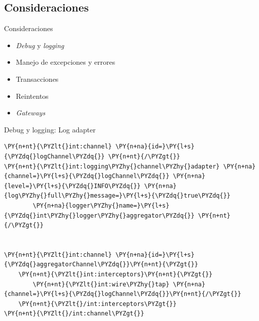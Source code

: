 \documentclass{beamer}
\begin{document}
\subsection{Consideraciones}
\begin{frame}{Consideraciones}
\begin{itemize}
\item \textit{Debug} y \textit{logging}
\item Manejo de excepciones y errores
\item Transacciones
\item Reintentos
\item \textit{Gateways}
\end{itemize}
\end{frame}

\begin{frame}[fragile]{Debug y logging: Log adapter}
\begin{Verbatim}[fontsize=\tiny,commandchars=\\\{\}]
\PY{n+nt}{\PYZlt{}int:channel} \PY{n+na}{id=}\PY{l+s}{\PYZdq{}logChannel\PYZdq{}} \PY{n+nt}{/\PYZgt{}}
\PY{n+nt}{\PYZlt{}int:logging\PYZhy{}channel\PYZhy{}adapter} \PY{n+na}{channel=}\PY{l+s}{\PYZdq{}logChannel\PYZdq{}} \PY{n+na}{level=}\PY{l+s}{\PYZdq{}INFO\PYZdq{}} \PY{n+na}{log\PYZhy{}full\PYZhy{}message=}\PY{l+s}{\PYZdq{}true\PYZdq{}} 
        \PY{n+na}{logger\PYZhy{}name=}\PY{l+s}{\PYZdq{}int\PYZhy{}logger\PYZhy{}aggregator\PYZdq{}} \PY{n+nt}{/\PYZgt{}}


\PY{n+nt}{\PYZlt{}int:channel} \PY{n+na}{id=}\PY{l+s}{\PYZdq{}aggregatorChannel\PYZdq{}}\PY{n+nt}{\PYZgt{}}
    \PY{n+nt}{\PYZlt{}int:interceptors}\PY{n+nt}{\PYZgt{}}
        \PY{n+nt}{\PYZlt{}int:wire\PYZhy{}tap} \PY{n+na}{channel=}\PY{l+s}{\PYZdq{}logChannel\PYZdq{}}\PY{n+nt}{/\PYZgt{}}
    \PY{n+nt}{\PYZlt{}/int:interceptors\PYZgt{}}
\PY{n+nt}{\PYZlt{}/int:channel\PYZgt{}}
\end{Verbatim}
\end{frame}
\end{document}
